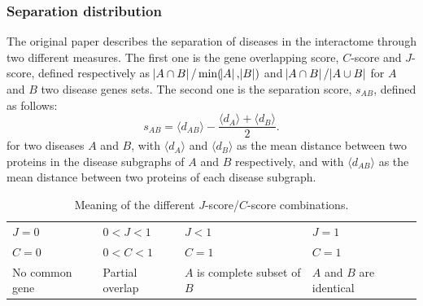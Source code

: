 \documentclass[letterpaper]{article}
\begin{document}
		\subsubsection{Separation distribution}
		The original paper describes the separation of diseases in the interactome through two different
		measures. The first one is the gene overlapping score, $C$-score and $J$-score, defined respectively
		as $\abs {A \cap B}/\min(\abs A, \abs B)$ and $\abs {A \cap B}/\abs {A \cup B}$ for $A$ and $B$ two
		disease genes sets. The second one is the separation score, $s_{AB}$, defined as follows:
		\begin{equation}
			s_{AB} = \langle d_{AB} \rangle - \frac {\langle d_A \rangle + \langle d_B \rangle}{2}.
		\end{equation}
		for two diseases $A$ and $B$, with $\langle d_A \rangle$ and $\langle d_B \rangle$ as the mean
		distance between two proteins in the disease subgraphs of $A$ and $B$ respectively, and with
		$\langle d_{AB} \rangle$ as the mean distance between two proteins of each disease subgraph.

		\begin{table}
		\begin{tabular}{m{}|m{}|m{}|m{}}
			$J = 0$ & $0 < J < 1$ & $J < 1$ & $J = 1$ \\
			$C = 0$ & $0 < C < 1$ & $C = 1$ & $C = 1$ \\
			\hline
			\hline
			No common gene & Partial overlap & $A$ is complete subset of $B$ & $A$ and $B$ are identical
		\end{tabular}
		\caption{Meaning of the different $J$-score/$C$-score combinations.\label{tab:J-C-scores}}
		\vspace{-.5cm}
		\end{table}
\end{document}
